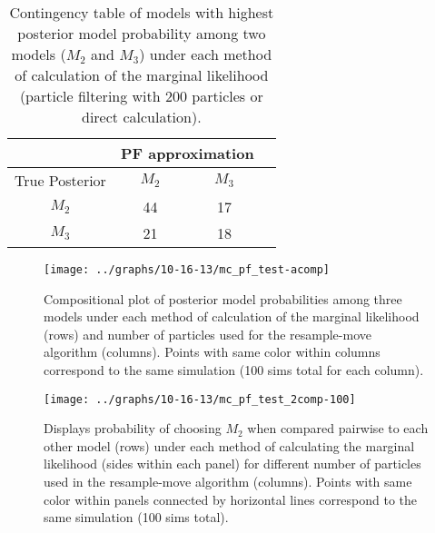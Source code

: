 \documentclass{article}
\begin{document}
\begin{table}
\begin{center}
\caption{Contingency table of models with highest posterior model probability among two models ($M_2$ and $M_3$) under each method of calculation of the marginal likelihood (particle filtering with 200 particles or direct calculation).} \label{tab:23mod200}
\begin{tabular}{|c|c|c|c|}
\hline
 & \multicolumn{2}{|c|}{PF approximation} \\
 \hline
 True Posterior & $M_2$& $M_3$  \\
 \hline
 $M_2$ & 44 & 17  \\
 \hline
 $M_3$ & 21 & 18 \\
 \hline
\end{tabular}
\end{center}
\end{table}

\begin{figure}
\texttt{[image: ../graphs/10-16-13/mc\_pf\_test-acomp]}
\caption{Compositional plot of posterior model probabilities among three models under each method of calculation of the marginal likelihood (rows) and number of particles used for the resample-move algorithm (columns). Points with same color within columns correspond to the same simulation (100 sims total for each column).} \label{fig:3comp}
\end{figure}

\begin{figure}
\texttt{[image: ../graphs/10-16-13/mc\_pf\_test\_2comp-100]}
\caption{Displays probability of choosing $M_2$ when compared pairwise to each other model (rows) under each method of calculating the marginal likelihood (sides within each panel) for different number of particles used in the resample-move algorithm (columns). Points with same color within panels connected by horizontal lines correspond to the same simulation (100 sims total).} \label{fig:2comp}
\end{figure}

\clearpage



\end{document}
